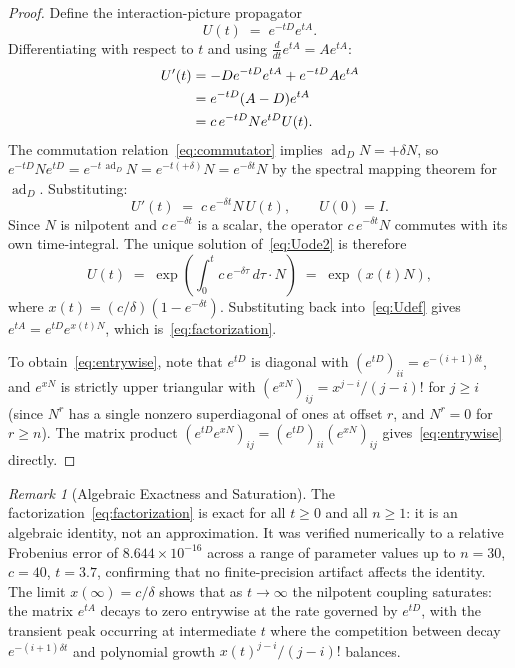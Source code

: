 \documentclass[11pt,reqno]{article}
\theoremstyle{plain}
\theoremstyle{definition}
\theoremstyle{remark}
\newtheorem{remark}[theorem]{Remark}
\numberwithin{equation}{section}
\begin{document}
\begin{proof}
Define the interaction-picture propagator
\begin{equation}\label{eq:Udef}
  U(t) \;=\; e^{-tD} e^{tA}.
\end{equation}
Differentiating with respect to $t$ and using $\frac{d}{dt}e^{tA} = Ae^{tA}$:
\begin{align}
  U'(t) &= -D e^{-tD} e^{tA} + e^{-tD} A e^{tA} \notag\\
  &= e^{-tD}(A - D) e^{tA} \notag\\
  &= c\,e^{-tD} N e^{tD} U(t). \label{eq:Uode}
\end{align}
The commutation relation~\eqref{eq:commutator} implies $\operatorname{ad}_D N = +\delta N$, so $e^{-tD} N e^{tD} = e^{-t\,\operatorname{ad}_D} N = e^{-t(+\delta)} N = e^{-\delta t} N$ by the spectral mapping theorem for $\operatorname{ad}_D$. Substituting:
\begin{equation}\label{eq:Uode2}
  U'(t) \;=\; c\,e^{-\delta t} N\,U(t), \qquad U(0) = I.
\end{equation}
Since $N$ is nilpotent and $c\,e^{-\delta t}$ is a scalar, the operator $c\,e^{-\delta t}N$ commutes with its own time-integral. The unique solution of~\eqref{eq:Uode2} is therefore
\begin{equation}\label{eq:Usolution}
  U(t) \;=\; \exp\left(\int_0^t c\,e^{-\delta\tau}\,d\tau \cdot N\right) \;=\; \exp\left(x(t)N\right),
\end{equation}
where $x(t) = (c/\delta)(1 - e^{-\delta t})$. Substituting back into~\eqref{eq:Udef} gives $e^{tA} = e^{tD}e^{x(t)N}$, which is~\eqref{eq:factorization}.

To obtain~\eqref{eq:entrywise}, note that $e^{tD}$ is diagonal with $(e^{tD})_{ii} = e^{-(i+1)\delta t}$, and $e^{xN}$ is strictly upper triangular with $(e^{xN})_{ij} = x^{j-i}/(j-i)!$ for $j \ge i$ (since $N^r$ has a single nonzero superdiagonal of ones at offset $r$, and $N^r = 0$ for $r \ge n$). The matrix product $(e^{tD}e^{xN})_{ij} = (e^{tD})_{ii}(e^{xN})_{ij}$ gives~\eqref{eq:entrywise} directly.
\end{proof}

\begin{remark}[Algebraic Exactness and Saturation]\label{rem:factorization}
The factorization~\eqref{eq:factorization} is exact for all $t \ge 0$ and all $n \ge 1$: it is an algebraic identity, not an approximation. It was verified numerically to a relative Frobenius error of $8.644 \times 10^{-16}$ across a range of parameter values up to $n = 30$, $c = 40$, $t = 3.7$, confirming that no finite-precision artifact affects the identity. The limit $x(\infty) = c/\delta$ shows that as $t \to \infty$ the nilpotent coupling saturates: the matrix $e^{tA}$ decays to zero entrywise at the rate governed by $e^{tD}$, with the transient peak occurring at intermediate $t$ where the competition between decay $e^{-(i+1)\delta t}$ and polynomial growth $x(t)^{j-i}/(j-i)!$ balances.
\end{remark}
\end{document}
